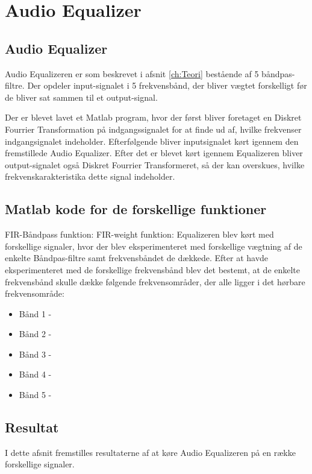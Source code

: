 \chapter{Audio Equalizer}\label{ch:Equalizer}
\section{Audio Equalizer}
Audio Equalizeren er som beskrevet i afsnit \ref{ch:Teori} bestående af 5 båndpas-filtre. Der opdeler input-signalet i 5 frekvensbånd, der bliver vægtet forskelligt før de bliver sat sammen til et output-signal.

Der er blevet lavet et Matlab program, hvor der først bliver foretaget en Diskret Fourrier Transformation på indgangssignalet for at finde ud af, hvilke frekvenser indgangsignalet indeholder.
Efterfølgende bliver inputsignalet kørt igennem den fremstillede Audio Equalizer. Efter det er blevet kørt igennem Equalizeren bliver output-signalet også Diskret Fourrier Transformeret, så der kan overskues, hvilke frekvenskarakteristika dette signal indeholder.
\section{Matlab kode for de forskellige funktioner}
FIR-Båndpass funktion:
\newline
\newline
FIR-weight funktion:
\newline
\newline
Equalizeren blev kørt med forskellige signaler, hvor der blev eksperimenteret med forskellige vægtning af de enkelte Båndpas-filtre samt frekvensbåndet de dækkede. Efter at havde eksperimenteret med de forskellige frekvensbånd blev det bestemt, at de enkelte frekvensbånd skulle dække følgende frekvensområder, der alle ligger i det hørbare frekvensområde:
\begin{itemize}
	\item Bånd 1 -
	\item Bånd 2 -
	\item Bånd 3 -
	\item Bånd 4 -
	\item Bånd 5 -
\end{itemize}

\section{Resultat}
I dette afsnit fremstilles resultaterne af at køre Audio Equalizeren på en række forskellige signaler.
